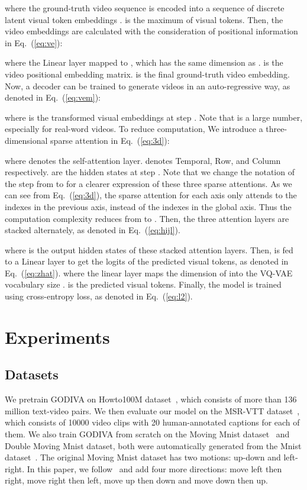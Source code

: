 \documentclass{article}
\begin{document}
where the ground-truth video sequence    is encoded into a sequence of discrete latent visual token embeddings  .  is the maximum of visual tokens. Then, the video embeddings are calculated with the consideration of positional information in Eq.~(\ref{eq:ve}):

where the Linear layer mapped  to  , which has the same dimension as .  is the video positional embedding matrix.  is the final ground-truth video embedding.  Now, a decoder can be trained to generate videos in an auto-regressive way, as denoted in Eq.~(\ref{eq:vem}):

where  is the transformed visual embeddings at step . Note that  is a large number, especially for real-word videos. To reduce computation, We introduce a three-dimensional sparse attention in Eq.~(\ref{eq:3d}):

where  denotes the self-attention layer. denotes Temporal, Row, and Column respectively.  are the hidden states at step . Note that we change the notation of the step from  to  for a clearer expression of these three sparse attentions. As we can see from Eq.~(\ref{eq:3d}), the sparse attention for each axis only attends to the indexes in the previous axis, instead of the indexes in the global axis.  Thus the computation complexity reduces from  to . Then, the three attention layers are stacked alternately, as denoted in Eq.~(\ref{eq:hijl}).

where  is the output hidden states of these stacked attention layers. Then,  is fed to a Linear layer to get the logits of the predicted visual tokens, as denoted in Eq.~(\ref{eq:zhat}).
where the linear layer  maps the dimension of   into the VQ-VAE vocabulary size  . is the predicted visual tokens. Finally, the model is trained using cross-entropy loss, as denoted in Eq.~(\ref{eq:l2}).


\section{Experiments}

\subsection{Datasets}
We pretrain GODIVA on Howto100M dataset~\cite{miechHowto100mLearningTextvideo2019}, which consists of more than 136 million text-video pairs. We then evaluate our model on the MSR-VTT dataset~\cite{xuMsrvttLargeVideo2016}, which consists of 10000 video clips with 20 human-annotated captions for each of them. We also train GODIVA from scratch on the Moving Mnist dataset~\cite{mittalSyncdrawAutomaticVideo2017} and Double Moving Mnist dataset, both were automatically generated from the Mnist dataset~\cite{LeCun_Backpropagationappliedhandwritten_1989}. The original Moving Mnist dataset has two motions: up-down and left-right. In this paper, we follow~\cite{dengIRCGANIntrospectiveRecurrent2019} and add four more directions: move left then right, move right then left, move up then down and move down then up.
\end{document}
